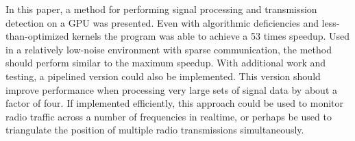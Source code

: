 \documentclass[conference]{IEEEtran}
\begin{document}
In this paper, a method for performing signal processing and transmission
detection on a GPU was presented. Even with algorithmic deficiencies and
less-than-optimized kernels the program was able to achieve a 53 times
speedup. Used in a relatively low-noise environment with sparse
communication, the method should
perform similar to the maximum speedup. With additional work and testing, a
pipelined version could also be implemented. This version should improve 
performance when processing very large sets of signal data by about
a factor of four. If implemented efficiently, this approach could be used
to monitor radio traffic across a number of frequencies in realtime,
or perhaps be used to triangulate the position of multiple radio
transmissions simultaneously.

%
%



%
%
\end{document}

